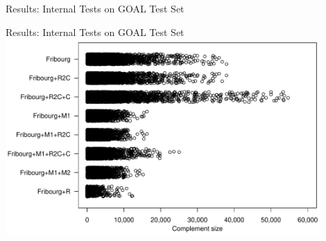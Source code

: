 \documentclass[12pt,handout]{beamer}
\begin{document}
\begin{frame}{Results: Internal Tests on GOAL Test Set}
\centering
\scriptsize
{\renewcommand{\arraystretch}{1.15}
}
\end{frame}

\begin{frame}{Results: Internal Tests on GOAL Test Set}
\centering
\includegraphics[width=0.9\textwidth]{figures/i.g/strip.pdf}
\end{frame}
\end{document}
